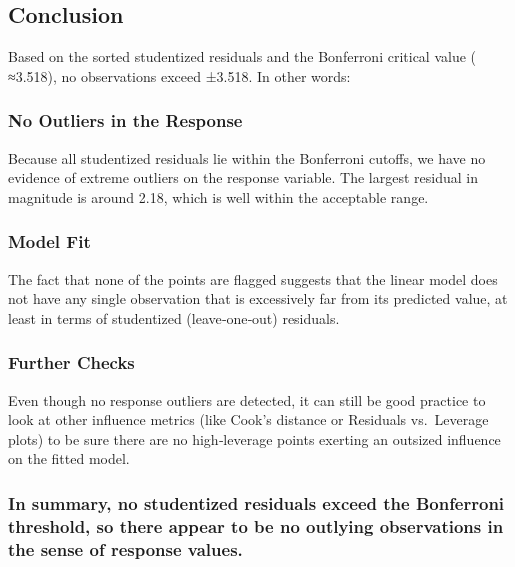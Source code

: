 \documentclass[
]{article}
\begin{document}
\subsection{Conclusion}\label{conclusion-3}

Based on the sorted studentized residuals and the Bonferroni critical
value ( ≈3.518), no observations exceed ±3.518. In other words:

\subsubsection{No Outliers in the
Response}\label{no-outliers-in-the-response}

Because all studentized residuals lie within the Bonferroni cutoffs, we
have no evidence of extreme outliers on the response variable. The
largest residual in magnitude is around 2.18, which is well within the
acceptable range.

\subsubsection{Model Fit}\label{model-fit}

The fact that none of the points are flagged suggests that the linear
model does not have any single observation that is excessively far from
its predicted value, at least in terms of studentized (leave‐one‐out)
residuals.

\subsubsection{Further Checks}\label{further-checks}

Even though no response outliers are detected, it can still be good
practice to look at other influence metrics (like Cook's distance or
Residuals vs.~Leverage plots) to be sure there are no high‐leverage
points exerting an outsized influence on the fitted model.

\subsubsection{In summary, no studentized residuals exceed the
Bonferroni threshold, so there appear to be no outlying observations in
the sense of response
values.}\label{in-summary-no-studentized-residuals-exceed-the-bonferroni-threshold-so-there-appear-to-be-no-outlying-observations-in-the-sense-of-response-values.}
\end{document}
